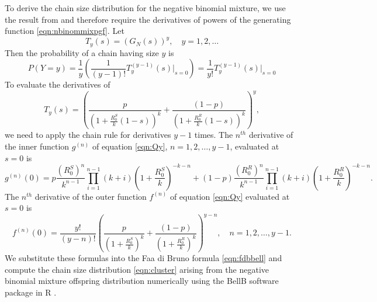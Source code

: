 \documentclass{imammb}
\numberwithin{equation}{section}
\begin{document}
To derive the chain size distribution for the negative binomial mixture, we use the result from \citet{Blumberg2013-xv} and therefore require the derivatives of powers of the generating function \eqref{eqn:nbinommixpgf}. Let $$T_y(s) =  (G_N(s))^y, \quad y = 1, 2, \dots $$ Then the probability of a chain having size $y$ \citep{Dwass1969-gs, Blumberg2013-xv} is
\begin{equation}\label{eqn:cluster}
    P(Y = y)  =\frac{1}{y}\left( \frac{1}{(y-1)!}T_y^{(y-1)}(s) \Bigr|_{s=0} \right ) =  \frac{1}{y!}T_y^{(y-1)}(s) \Bigr|_{s=0}
\end{equation}
To evaluate the derivatives of 
\begin{equation}\label{eqn:Qy}
   T_y(s)=  \left (\frac{p}{(1 + \frac{R_0^S}{k}(1-s))^k} +   \frac{(1-p)}{(1 + \frac{R_0^R}{k}(1-s))^k} \right)^y,
\end{equation}
we need to apply the chain rule for derivatives $y-1$ times.
The $n^{th}$ derivative of the inner function $g^{(n)}$ of equation \eqref{eqn:Qy},  $n = 1, 2, \dots, y-1$, evaluated at $s=0$ is
\begin{equation*}
    g^{(n)}(0) =  p \frac{(R_0^S)^n}{k^{n-1}} \displaystyle \prod_{i=1}^{n-1} (k+i) \left(1+\frac{R_0^S}{k}\right)^{-k-n}+ (1-p)\frac{(R_0^R)^n}{k^{n-1}} \displaystyle \prod_{i=1}^{n-1} (k+i)\left (1+\frac{R_0^R}{k}\right)^{-k-n}.
\end{equation*}
The $n^{th}$ derivative of the outer function $f^{(n)}$ of equation \eqref{eqn:Qy} evaluated at $s=0$ is
\begin{equation*}
    f^{(n)}(0) =  \frac{y!}{(y-n)! }\left (\frac{p}{(1 + \frac{R_0^S}{k})^k} +   \frac{(1-p)}{(1 + \frac{R_0^R}{k})^k} \right )^{y-n}, \quad n = 1, 2, \dots, y-1.
\end{equation*}
We substitute these formulas into the Faa di Bruno formula \eqref{eqn:fdbbell} and compute the chain size distribution \eqref{eqn:cluster} arising from the negative binomial mixture offspring distribution numerically using the BellB  software package in R \citep{??}.


\end{document}
